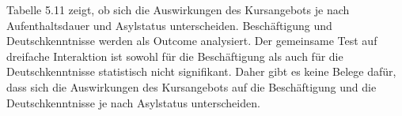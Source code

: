 Tabelle 5.11 zeigt, ob sich die Auswirkungen des Kursangebots je nach Aufenthaltsdauer und Asylstatus unterscheiden. Beschäftigung und Deutschkenntnisse werden als Outcome analysiert. Der gemeinsame Test auf dreifache Interaktion ist sowohl für die Beschäftigung als auch für die Deutschkenntnisse statistisch nicht signifikant. Daher gibt es keine Belege dafür, dass sich die Auswirkungen des Kursangebots auf die Beschäftigung und die Deutschkenntnisse je nach Asylstatus unterscheiden.